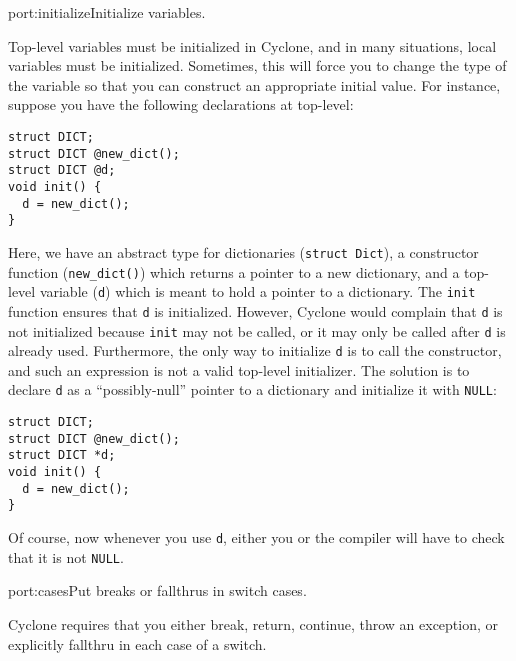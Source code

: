 \begin{porta}{port:initialize}{Initialize variables.}  

Top-level variables must be initialized
in Cyclone, and in many situations, local variables must be initialized.
Sometimes, this will force you to change the type of the variable
so that you can construct an appropriate initial value.  For instance,
suppose you have the following declarations at top-level:
\begin{verbatim}
struct DICT; 
struct DICT @new_dict();
struct DICT @d;
void init() {
  d = new_dict();
}
\end{verbatim}
Here, we have an abstract type for dictionaries 
(\texttt{struct Dict}), a constructor
function (\texttt{new\_dict()}) which returns a pointer to a new
dictionary, and a top-level variable (\texttt{d}) which is meant
to hold a pointer to a dictionary.  The \texttt{init} function
ensures that \texttt{d} is initialized.  However, 
Cyclone would complain that 
\texttt{d} is not initialized because \texttt{init} may not be
called, or it may only be called after \texttt{d} is already used.  
Furthermore, the only way to initialize \texttt{d}
is to call the constructor, and such an expression is not a 
valid top-level initializer.  The solution is to declare \texttt{d} as
a ``possibly-null'' pointer to a dictionary and initialize it
with \texttt{NULL}:
\begin{verbatim}
struct DICT; 
struct DICT @new_dict();
struct DICT *d;
void init() {
  d = new_dict();
}
\end{verbatim}
Of course, now whenever you use \texttt{d}, either you or the compiler
will have to check that it is not \texttt{NULL}.
\end{porta}

\begin{porta}{port:cases}{Put breaks or fallthrus in switch cases.}  

Cyclone requires
that you either break, return, continue, throw an exception, or explicitly
fallthru in each case of a switch.  
\end{porta}

